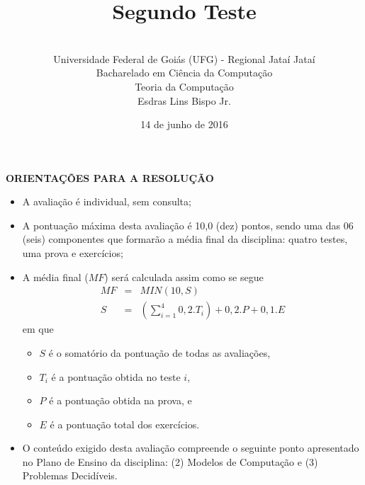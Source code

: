 \documentclass[12pt,a4paper,oneside]{article}
\author{\\Universidade Federal de Goiás (UFG) - Regional Jataí Jataí\\Bacharelado em Ciência da Computação \\Teoria da Computação \\Esdras Lins Bispo Jr.}
\date{14 de junho de 2016}
\title{\sc \huge Segundo Teste}
\begin{document}
\maketitle

{\bf ORIENTAÇÕES PARA A RESOLUÇÃO}

\begin{itemize}
	\item A avaliação é individual, sem consulta;
	\item A pontuação máxima desta avaliação é 10,0 (dez) pontos, sendo uma das 06 (seis) componentes que formarão a média final da disciplina: quatro testes, uma prova e exercícios;
	\item A média final ($MF$) será calculada assim como se segue
	\begin{eqnarray}
		MF & = & MIN(10, S) \nonumber \\
		S & = & (\sum_{i=1}^{4} 0,2.T_i ) + 0,2.P  + 0,1.E \nonumber
	\end{eqnarray}
	em que 
	\begin{itemize}
		\item $S$ é o somatório da pontuação de todas as avaliações,
		\item $T_i$ é a pontuação obtida no teste $i$,
		\item $P$ é a pontuação obtida na prova, e
		\item $E$ é a pontuação total dos exercícios.
	\end{itemize}
	\item O conteúdo exigido desta avaliação compreende o seguinte ponto apresentado no Plano de Ensino da disciplina: (2) Modelos de Computação e (3) Problemas Decidíveis.
\end{itemize}

\begin{center}
\end{center}

\newpage
\end{document}
